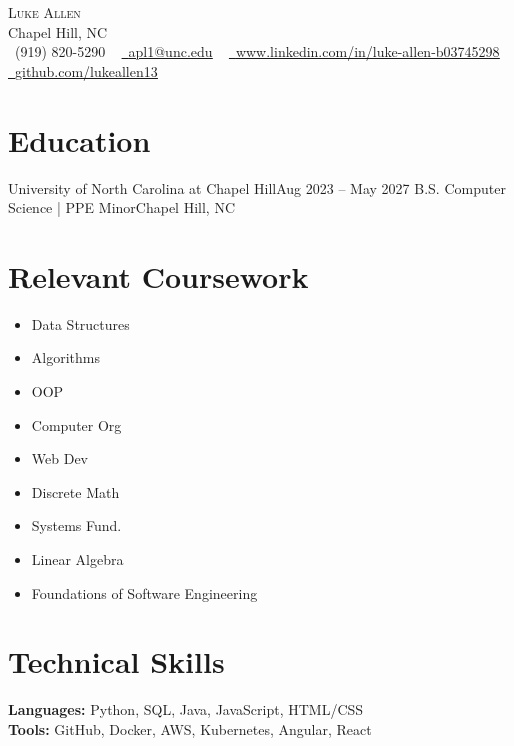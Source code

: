 \begin{center}
    {\Huge \scshape Luke Allen} \\ \vspace{1pt}
    Chapel Hill, NC \\ \vspace{1pt}
    \small \raisebox{-0.1\height}\faPhone\ (919) 820-5290 ~ 
    \href{mailto:jeyoo@unc.edu}{\raisebox{-0.2\height}\faEnvelope\ \underline{apl1@unc.edu}} ~ 
    \href{www.linkedin.com/in/luke-allen-b03745298}{\raisebox{-0.2\height}\faLinkedin\ \underline{www.linkedin.com/in/luke-allen-b03745298}}  ~
    \href{https://github.com/lukeallen13}{\raisebox{-0.2\height}\faGithub\ \underline{github.com/lukeallen13}}
    \vspace{-8pt}
\end{center}

\section{Education}
  \resumeSubHeadingListStart
    \resumeSubheading
      {University of North Carolina at Chapel Hill}{Aug 2023 -- May 2027}
      {B.S. Computer Science | PPE Minor}{Chapel Hill, NC}
  \resumeSubHeadingListEnd

\section{Relevant Coursework}
\begin{multicols}{4}
  \begin{itemize}[itemsep=-4pt]
    \item Data Structures
    \item Algorithms
    \item OOP
    \item Computer Org
    \item Web Dev
    \item Discrete Math
    \item Systems Fund.
    \item Linear Algebra
    \item Foundations of Software Engineering
  \end{itemize}
\end{multicols}

\section{Technical Skills}
 \begin{itemize}[leftmargin=0.15in, label={}]
    \small{\item{
     \textbf{Languages:} Python, SQL, Java, JavaScript, HTML/CSS \\
     \textbf{Tools:} GitHub, Docker, AWS, Kubernetes, Angular, React
    }}
 \end{itemize}

